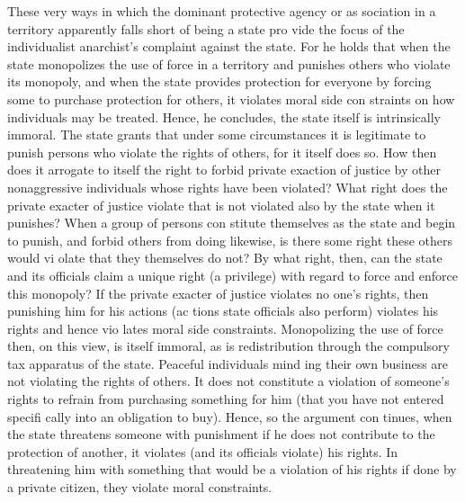 \documentclass[11pt,openany]{book}
\begin{document}
These very ways in which the dominant protective agency or as sociation in a territory apparently falls short of being a state pro vide the focus of the individualist anarchist's complaint against the state. For he holds that when the state monopolizes the use of force in a territory and punishes others who violate its monopoly, and when the state provides protection for everyone by forcing some to purchase protection for others, it violates moral side con straints on how individuals may be treated. Hence, he concludes, the state itself is intrinsically immoral. The state grants that under some circumstances it is legitimate to punish persons who violate the rights of others, for it itself does so. How then does it arrogate to itself the right to forbid private exaction of justice by other nonaggressive individuals whose rights have been violated? What right does the private exacter of justice violate that is not violated also by the state when it punishes? When a group of persons con stitute themselves as the state and begin to punish, and forbid others from doing likewise, is there some right these others would vi olate that they themselves do not? By what right, then, can the state and its officials claim a unique right (a privilege) with regard to force and enforce this monopoly? If the private exacter of justice violates no one's rights, then punishing him for his actions (ac tions state officials also perform) violates his rights and hence vio lates moral side constraints. Monopolizing the use of force then, on this view, is itself immoral, as is redistribution through the compulsory tax apparatus of the state. Peaceful individuals mind ing their own business are not violating the rights of others. It does not constitute a violation of someone's rights to refrain from purchasing something for him (that you have not entered specifi cally into an obligation to buy). Hence, so the argument con tinues, when the state threatens someone with punishment if he does not contribute to the protection of another, it violates (and its officials violate) his rights. In threatening him with something that would be a violation of his rights if done by a private citizen, they violate moral constraints. 
\end{document}
